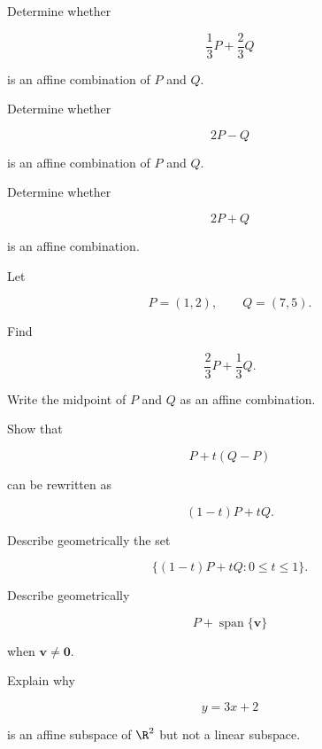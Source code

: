 \begin{exercise}[1]
Determine whether

\[ \frac13P+\frac23Q \]

is an affine combination of \(P\) and \(Q\).
\end{exercise}

\begin{exercise}[1]
Determine whether

\[ 2P-Q \]

is an affine combination of \(P\) and \(Q\).
\end{exercise}

\begin{exercise}[1]
Determine whether

\[ 2P+Q \]

is an affine combination.
\end{exercise}

\begin{exercise}[2]
Let

\[ P=(1,2),\qquad Q=(7,5). \]

Find

\[ \frac23P+\frac13Q. \]
\end{exercise}

\begin{exercise}[2]
Write the midpoint of \(P\) and \(Q\) as an affine combination.
\end{exercise}

\begin{exercise}[2]
Show that

\[ P+t(Q-P) \]

can be rewritten as

\[ (1-t)P+tQ. \]
\end{exercise}

\begin{exercise}[2]
Describe geometrically the set

\[ \{(1-t)P+tQ:0\leq t\leq1\}. \]
\end{exercise}

\begin{exercise}[2]
Describe geometrically

\[ P+\operatorname{span}\{\mathbf{v}\} \]

when \(\mathbf{v}\neq\mathbf{0}\).
\end{exercise}

\begin{exercise}[2]
Explain why

\[ y=3x+2 \]

is an affine subspace of \(\R^2\) but not a linear subspace.
\end{exercise}

